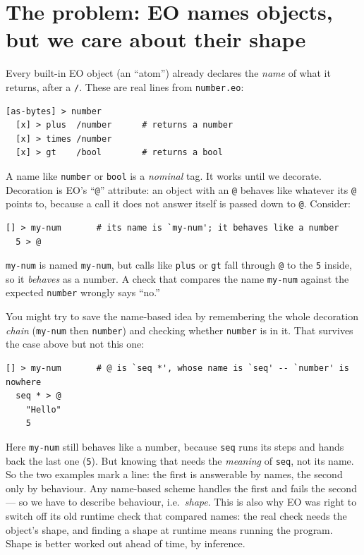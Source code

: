 \documentclass[10pt]{article}
\begin{document}
\section{The problem: EO names objects, but we care about their shape}

Every built-in EO object (an ``atom'') already declares the \emph{name} of what
it returns, after a \verb|/|. These are real lines from \texttt{number.eo}:
\begin{lstlisting}
[as-bytes] > number
  [x] > plus  /number      # returns a number
  [x] > times /number
  [x] > gt    /bool        # returns a bool
\end{lstlisting}
A name like \texttt{number} or \texttt{bool} is a \emph{nominal} tag. It works
until we decorate. Decoration is EO's ``\texttt{@}'' attribute: an object with
an \texttt{@} behaves like whatever its \texttt{@} points to, because a call it
does not answer itself is passed down to \texttt{@}. Consider:
\begin{lstlisting}
[] > my-num       # its name is `my-num'; it behaves like a number
  5 > @
\end{lstlisting}
\verb|my-num| is named \verb|my-num|, but calls like \verb|plus| or \verb|gt|
fall through \verb|@| to the \verb|5| inside, so it \emph{behaves} as a number.
A check that compares the name \verb|my-num| against the expected \verb|number|
wrongly says ``no.''

You might try to save the name-based idea by remembering the whole decoration
\emph{chain} (\verb|my-num| then \verb|number|) and checking whether
\verb|number| is in it. That survives the case above but not this one:
\begin{lstlisting}
[] > my-num       # @ is `seq *', whose name is `seq' -- `number' is nowhere
  seq * > @
    "Hello"
    5
\end{lstlisting}
Here \verb|my-num| still behaves like a number, because \verb|seq| runs its
steps and hands back the last one (\verb|5|). But knowing that needs the
\emph{meaning} of \verb|seq|, not its name. So the two examples mark a line: the
first is answerable by names, the second only by behaviour. Any name-based
scheme handles the first and fails the second --- so we have to describe
behaviour, i.e.\ \emph{shape}. This is also why EO was right to switch off its
old runtime check that compared names: the real check needs the object's shape,
and finding a shape at runtime means running the program. Shape is better
worked out ahead of time, by inference.
\end{document}
